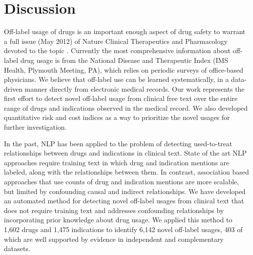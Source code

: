 \section{Discussion}
Off-label usage of drugs is an important enough aspect of drug safety
to warrant a full issue (May 2012) of Nature Clinical Therapeutics and
Pharmacology devoted to the topic \cite{Epstein2012}.  Currently the
most comprehensive information about off-label drug usage is from the
National Disease and Therapeutic Index (IMS Health, Plymouth Meeting,
PA), which relies on periodic surveys of office-based physicians. We
believe that off-label use can be learned systematically, in a
data-driven manner directly from electronic medical records.  Our work
represents the first effort to detect novel off-label usage from
clinical free text over the entire range of drugs and indications
observed in the medical record.  We also developed quantitative risk
and cost indices as a way to prioritize the novel usages for further
investigation.

In the past, NLP has been applied to the problem of detecting
used-to-treat relationships between drugs and indications in clinical
text.  State of the art NLP approaches require training text in which
drug and indication mentions are labeled, along with the relationships
between them.  In contrast, association based approaches that use
counts of drug and indication mentions are more scalable, but limited
by confounding causal and indirect relationships.  We have developed
an automated method for detecting novel off-label usages from clinical
text that does not require training text and addresses confounding
relationships by incorporating prior knowledge about drug usage.  We
applied this method to 1,602 drugs and 1,475 indications to identify
6,142 novel off-label usages, 403 of which are well supported by
evidence in independent and complementary datasets.


